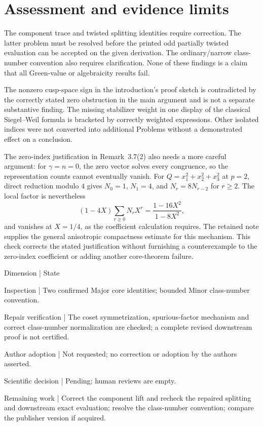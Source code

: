 \documentclass[10pt]{article}
\begin{document}
\section*{Assessment and evidence limits}
The component trace and twisted splitting identities require correction. The latter problem must be resolved before the printed odd partially twisted evaluation can be accepted on the given derivation. The ordinary/narrow class-number convention also requires clarification. None of these findings is a claim that all Green-value or algebraicity results fail.\par
The nonzero cusp-space sign in the introduction’s proof sketch is contradicted by the correctly stated zero obstruction in the main argument and is not a separate substantive finding. The missing stabilizer weight in one display of the classical Siegel–Weil formula is bracketed by correctly weighted expressions. Other isolated indices were not converted into additional Problems without a demonstrated effect on a conclusion.\par
The zero-index justification in Remark 3.7(2) also needs a more careful argument: for \(\gamma=n=0\), the zero vector solves every congruence, so the representation counts cannot eventually vanish. For \(Q=x_1^2+x_2^2+x_3^2\) at \(p=2\), direct reduction modulo \(4\) gives \(N_0=1\), \(N_1=4\), and \(N_r=8N_{r-2}\) for \(r\geq2\). The local factor is nevertheless \[(1-4X)\sum_{r\geq0}N_rX^r
 =\frac{1-16X^2}{1-8X^2},\] and vanishes at \(X=1/4\), as the coefficient calculation requires. The retained note supplies the general anisotropic compactness estimate for this mechanism. This check corrects the stated justification without furnishing a counterexample to the zero-index coefficient or adding another core-theorem failure.\par
Dimension | State\par
Inspection | Two confirmed Major core identities; bounded Minor class-number convention.\par
Repair verification | The coset symmetrization, spurious-factor mechanism and correct class-number normalization are checked; a complete revised downstream proof is not certified.\par
Author adoption | Not requested; no correction or adoption by the authors asserted.\par
Scientific decision | Pending; human reviews are empty.\par
Remaining work | Correct the component lift and recheck the repaired splitting and downstream exact evaluation; resolve the class-number convention; compare the publisher version if acquired.\par
\end{document}
